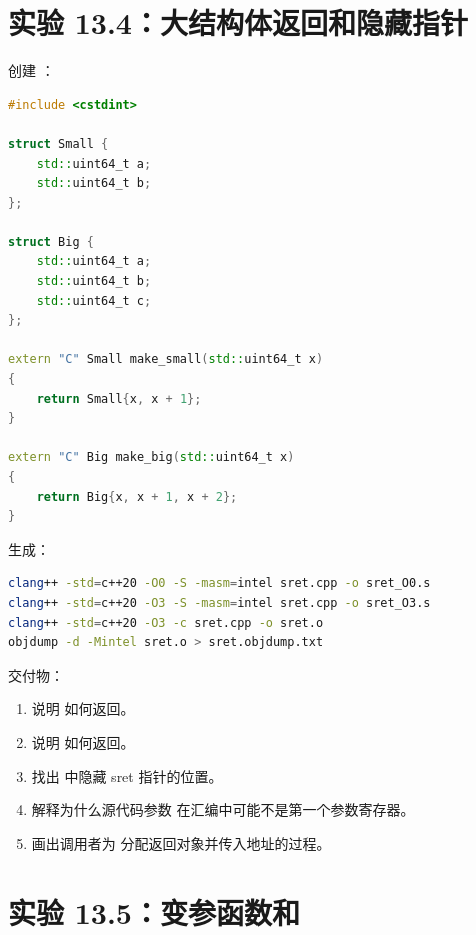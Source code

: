 \section{实验 13.4：大结构体返回和隐藏指针}

\begin{labbox}
创建 ：

\begin{lstlisting}[language=C++]
#include <cstdint>

struct Small {
    std::uint64_t a;
    std::uint64_t b;
};

struct Big {
    std::uint64_t a;
    std::uint64_t b;
    std::uint64_t c;
};

extern "C" Small make_small(std::uint64_t x)
{
    return Small{x, x + 1};
}

extern "C" Big make_big(std::uint64_t x)
{
    return Big{x, x + 1, x + 2};
}
\end{lstlisting}

生成：

\begin{lstlisting}[language=bash]
clang++ -std=c++20 -O0 -S -masm=intel sret.cpp -o sret_O0.s
clang++ -std=c++20 -O3 -S -masm=intel sret.cpp -o sret_O3.s
clang++ -std=c++20 -O3 -c sret.cpp -o sret.o
objdump -d -Mintel sret.o > sret.objdump.txt
\end{lstlisting}

交付物：

\begin{enumerate}
  \item 说明  如何返回。
  \item 说明  如何返回。
  \item 找出  中隐藏 sret 指针的位置。
  \item 解释为什么源代码参数  在汇编中可能不是第一个参数寄存器。
  \item 画出调用者为  分配返回对象并传入地址的过程。
\end{enumerate}
\end{labbox}

\section{实验 13.5：变参函数和 }

